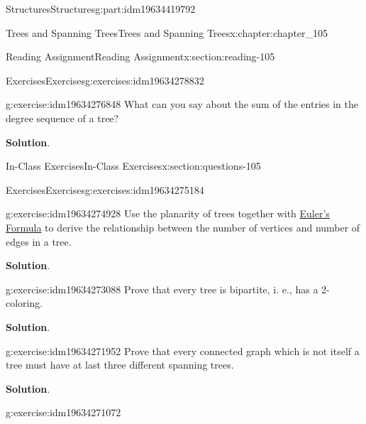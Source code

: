 \documentclass[oneside,10pt,]{book}
\newcommand{\blocktitlefont}{\relax}
\numberwithin{equation}{section}
\begin{document}
\begin{partptx}{Structures}{}{Structures}{}{}{g:part:idm19634419792}
\begin{chapterptx}{Trees and Spanning Trees}{}{Trees and Spanning Trees}{}{}{x:chapter:chapter_105}
\begin{sectionptx}{Reading Assignment}{}{Reading Assignment}{}{}{x:section:reading-105}
\begin{exercises-subsection-numberless}{Exercises}{}{Exercises}{}{}{g:exercises:idm19634278832}
\begin{exercisegroup}
\begin{divisionexerciseeg}{2}{}{}{g:exercise:idm19634276848}
What can you say about the sum of the entries in the degree sequence of a tree?%
\par\smallskip%
\noindent\textbf{\blocktitlefont Solution}.\hypertarget{g:solution:idm19634276176}{}\quad{}%
\end{divisionexerciseeg}%
\end{exercisegroup}
\par\medskip\noindent
\end{exercises-subsection-numberless}
\end{sectionptx}
%
%
\typeout{************************************************}
\typeout{************************************************}
%
\begin{sectionptx}{In-Class Exercises}{}{In-Class Exercises}{}{}{x:section:questions-105}
%
%
%
\typeout{************************************************}
\typeout{************************************************}
%
\begin{exercises-subsection-numberless}{Exercises}{}{Exercises}{}{}{g:exercises:idm19634275184}
\par\medskip\noindent%
%
\begin{exercisegroup}
\begin{divisionexerciseeg}{1}{}{}{g:exercise:idm19634274928}%
Use the planarity of trees together with \hyperref[x:theorem:theorem-euler-formula-statement]{Euler's Formula} to derive the relationship between the number of vertices and number of edges in a tree.%
\par\smallskip%
\noindent\textbf{\blocktitlefont Solution}.\hypertarget{g:solution:idm19634274112}{}\quad{}%
\end{divisionexerciseeg}%
\begin{divisionexerciseeg}{2}{}{}{g:exercise:idm19634273088}%
Prove that every tree is bipartite, i. e., has a 2-coloring.%
\par\smallskip%
\noindent\textbf{\blocktitlefont Solution}.\hypertarget{g:solution:idm19634272208}{}\quad{}%
\end{divisionexerciseeg}%
\begin{divisionexerciseeg}{3}{}{}{g:exercise:idm19634271952}%
Prove that every connected graph which is not itself a tree must have at last three different spanning trees.%
\par\smallskip%
\noindent\textbf{\blocktitlefont Solution}.\hypertarget{g:solution:idm19634271328}{}\quad{}%
\end{divisionexerciseeg}%
\begin{divisionexerciseeg}{4}{}{}{g:exercise:idm19634271072}%

\end{divisionexerciseeg}
\end{exercisegroup}
\end{exercises-subsection-numberless}
\end{sectionptx}
\end{chapterptx}
\end{partptx}
\end{document}
